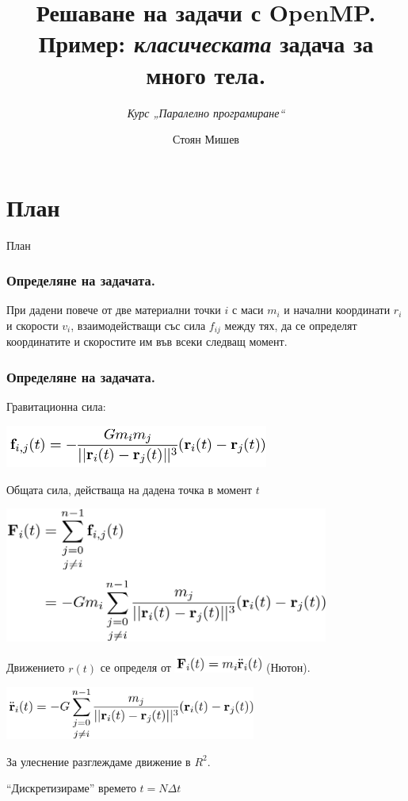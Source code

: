 \documentclass{beamer}
\title{Решаване на задачи с OpenMP. Пример: \textit{класическата} задача за много тела.}
\subtitle{\textit{Курс „Паралелно програмиране“}}
\author{\newline \newline Стоян Мишев}
\date{} %
\begin{document}
\lstset{language=Python}
{ 
\frame{\titlepage}}


\section*{План}\begin{frame}{План}\tableofcontents\end{frame}

\begin{frame}
  \frametitle{Определяне на задачата.}
  При дадени повече от две материални точки $i$ с маси $m_i$ и начални
  координати $r_i$ и скорости $v_i$, взаимодействащи със сила $f_{ij}$
  между тях, да се определят координатите и скоростите им във всеки
  следващ момент.
\end{frame}

\begin{frame}
  \frametitle{Определяне на задачата.}
  Гравитационна сила:


  \includegraphics[width=0.65\textwidth]{force1} \pause

  Общата сила, действаща на дадена точка в момент $t$ 

  \includegraphics[width=0.8\textwidth]{force2}
\end{frame}

\begin{frame}
  Движението $r(t)$ се определя от 
  \includegraphics[width=0.22\textwidth]{force3} (Нютон). \pause

  \includegraphics[width=0.62\textwidth]{accel}

  За улеснение разглеждаме движение в $R^2$.

  ``Дискретизираме'' времето $t=N\Delta t$
\end{frame}
\end{document}
